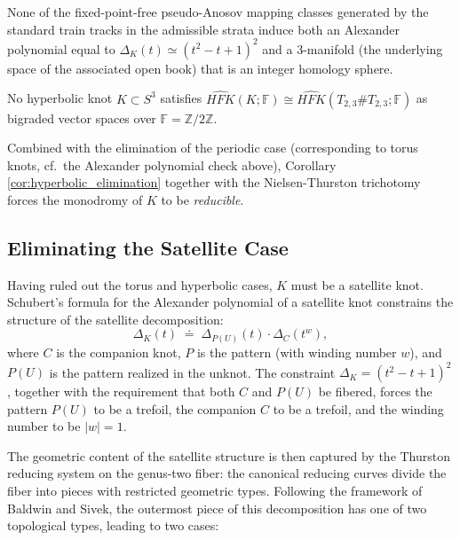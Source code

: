 \begin{theorem} \label{thm:homological_elimination}
None of the fixed-point-free pseudo-Anosov mapping classes generated by the standard train tracks in the admissible strata induce both an Alexander polynomial equal to $\Delta_K(t) \simeq (t^2-t+1)^2$ and a 3-manifold (the underlying space of the associated open book) that is an integer homology sphere.
\end{theorem}

\begin{corollary}\label{cor:hyperbolic_elimination}
No hyperbolic knot $K \subset S^3$ satisfies $\widehat{HFK}(K; \mathbb{F}) \cong \widehat{HFK}(T_{2,3} \# T_{2,3}; \mathbb{F})$ as bigraded vector spaces over $\mathbb{F} = \mathbb{Z}/2\mathbb{Z}$.
\end{corollary}

Combined with the elimination of the periodic case (corresponding to torus knots, cf.\ the Alexander polynomial check above), Corollary \ref{cor:hyperbolic_elimination} together with the Nielsen-Thurston trichotomy forces the monodromy of $K$ to be \textit{reducible}.

\subsection{Eliminating the Satellite Case}

Having ruled out the torus and hyperbolic cases, $K$ must be a satellite knot. Schubert's formula for the Alexander polynomial of a satellite knot constrains the structure of the satellite decomposition:
\[
\Delta_K(t) \;\doteq\; \Delta_{P(U)}(t) \cdot \Delta_C(t^w),
\]
where $C$ is the companion knot, $P$ is the pattern (with winding number $w$), and $P(U)$ is the pattern realized in the unknot. The constraint $\Delta_K = (t^2 - t + 1)^2$, together with the requirement that both $C$ and $P(U)$ be fibered, forces the pattern $P(U)$ to be a trefoil, the companion $C$ to be a trefoil, and the winding number to be $|w| = 1$.

The geometric content of the satellite structure is then captured by the Thurston reducing system on the genus-two fiber: the canonical reducing curves divide the fiber into pieces with restricted geometric types. Following the framework of Baldwin and Sivek, the outermost piece of this decomposition has one of two topological types, leading to two cases:

